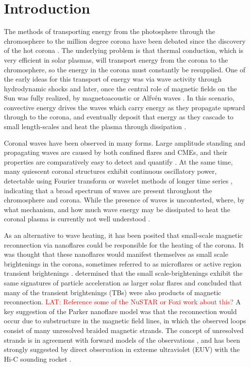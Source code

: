 \documentclass[twocolumn]{aastex62}
\newcommand{\latcomment}[1]{\textcolor{red}{LAT: #1}}
\begin{document}
\section{Introduction} \label{sec:intro}
The methods of transporting energy from the photosphere through the chromosphere to the million degree corona have been debated since the discovery of the hot corona \citep[][]{1933LyotMarshall, 1939Grotrian}. 
The underlying problem is that thermal conduction, which is very efficient in solar plasmas, will transport energy from the corona to the chromosphere, so the energy in the corona must constantly be resupplied.  
One of the early ideas for this transport of energy was via wave activity through hydrodynamic shocks \citep[][]{1949Schatzman} and later, once the central role of magnetic fields on the Sun was fully realized, by magnetoacoustic or Alfv\'en waves \citep{1961Osterbrock}. 
In this scenario, convective energy drives the waves which carry energy as they propagate upward through to the corona, and eventually deposit that energy as they cascade to small length-scales and heat the plasma through dissipation \citep{2014vanBallegooijenEA_FootpointMotion}.

Coronal waves have been observed in many forms. 
Large amplitude standing and propagating waves are caused by both confined flares and CMEs, and their properties are comparatively easy to detect and quantify \citep{2014LiuOfman_EUVwaves}. 
At the same time, many quiescent coronal structures exhibit continuous oscillatory power, detectable using Fourier transform or wavelet methods of longer time series \citep{Tomczyk:2009}, indicating that a broad spectrum of waves are present throughout the chromosphere and corona.
While the presence of waves is uncontested, where, by what mechanism, and how much wave energy may be dissipated to heat the coronal plasma is currently not well understood \citep{2014vanBallegooijenEA_FootpointMotion}.

As an alternative to wave heating, it has been posited that small-scale magnetic reconnection via nanoflares \citep[][]{1983Parker} could be responsible for the heating of the corona. 
It was thought that these nanoflares would manifest themselves as small scale brightenings in the corona, sometimes referred to as microflares or active region transient brightenings \citep[][]{1984LinEA_microflares, 1991Hudson, 1992ShimizuEA, 1995Shimizu}. 
\citet{1997GaryEA} determined that the small scale-brightenings exhibit the same signatures of particle acceleration as larger solar flares and concluded that many of the transient brightenings (TBs) were also products of magnetic reconnection. \latcomment{Reference some of the NuSTAR or Foxi work about this?} 
A key suggestion of the Parker nanoflare model was that the reconnection would occur due to substructure in the magnetic field lines, in which the observed loops consist of many unresolved braided magnetic strands. 
The concept of unresolved strands is in agreement with forward models of the observations \citep[e.g.][]{2012BrooksEA, 2014KobelskiEA_XRTTBs, 2014KobelskiMcKenzie_HiC}, and has been strongly suggested by direct observation in extreme ultraviolet (EUV) with the Hi-C sounding rocket \citep[][]{2013CirtainEA_HiC}. 
\end{document}
